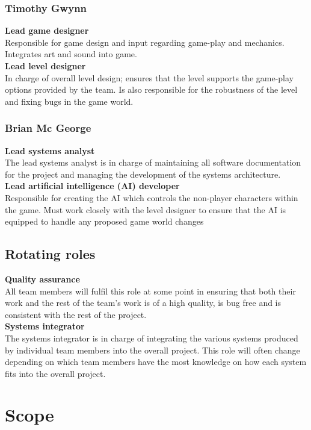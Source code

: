 \documentclass[a4paper,10pt]{article}
\begin{document}
\subsubsection{Timothy Gwynn}
\textbf{Lead game designer}\\
Responsible for game design and input regarding game-play and mechanics. Integrates art and sound into game.
\smallskip\\
\textbf{Lead level designer}\\
In charge of overall level design; ensures that the level supports the game-play options provided by the team. Is also responsible for the robustness of the level and fixing bugs in the game world.

\subsubsection{Brian Mc George}
\textbf{Lead systems analyst}\\
The lead systems analyst is in charge of maintaining all software documentation for the project and managing the development of the systems architecture.
\smallskip\\
\textbf{Lead artificial intelligence (AI) developer}\\
Responsible for creating the AI which controls the non-player characters within the game. Must work closely with the level designer to ensure that the AI is equipped to handle any proposed game world changes

\subsection{Rotating roles}
\textbf{Quality assurance}\\
All team members will fulfil this role at some point in ensuring that both their work and the rest of the team's work is of a high quality, is bug free and is consistent with the rest of the project.
\smallskip\\
\textbf{Systems integrator}\\
The systems integrator is in charge of integrating the various systems produced by individual team members into the overall project. This role will often change depending on which team members have the most knowledge on how each system fits into the overall project.

\section{Scope}
\end{document}
